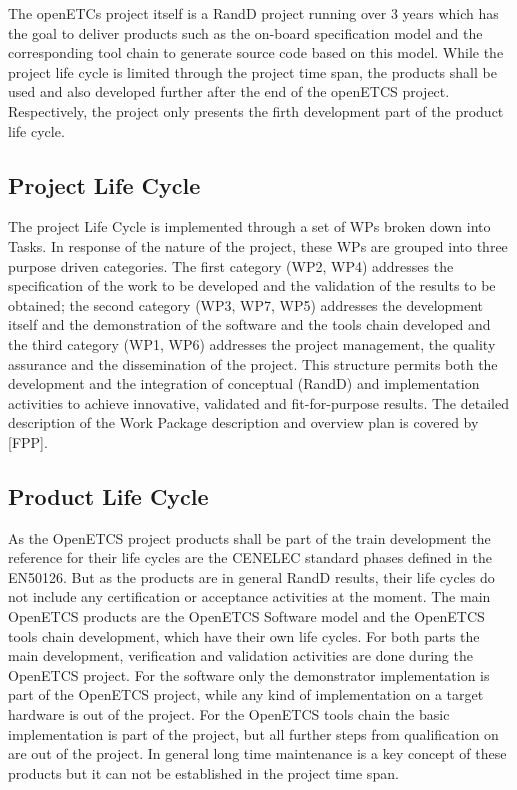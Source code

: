\documentclass{template/openetcs_article}
\begin{document}
The openETCs project itself is a \gls{RandD} project running over 3 years which has the goal to deliver products such as the on-board specification model and the corresponding tool chain to generate source code based on this model. While the project life cycle is limited through the project time span, the products shall be used and also developed further after the end of the openETCS project. Respectively, the project only presents the firth development part of the product life cycle.

\subsection{Project Life Cycle }

The project Life Cycle is implemented through a set of WPs broken down into Tasks. In response of the nature of the project, these WPs are grouped into three purpose driven categories. The first category (WP2, WP4) addresses the specification of the work to be developed and the validation of the results to be obtained; the second category (WP3, WP7, WP5) addresses the development itself and the demonstration of the software and the tools chain developed and the third category (WP1, WP6) addresses the project management, the quality assurance and the dissemination of the project.
This structure permits both the development and the integration of conceptual (\gls{RandD}) and implementation activities to achieve innovative, validated and fit-for-purpose results.
The detailed description of the Work Package description and overview plan is covered by [FPP].  


\subsection{Product Life Cycle }

As the OpenETCS project products shall be part of the train development the reference for their life cycles are the CENELEC standard phases defined in the EN50126. But as the products are in general \gls{RandD} results, their life cycles do not include any certification or acceptance activities at the moment.
The main OpenETCS products are the OpenETCS Software model and the OpenETCS tools chain development, which have their own life cycles. For both parts the main development, verification and validation activities are done during the OpenETCS project. For the software only the demonstrator implementation is part of the OpenETCS project, while any kind of implementation on a target hardware is out of the project. 
For the OpenETCS tools chain the basic implementation is part of the project, but all further steps from qualification on are out of the project.
In general long time maintenance is a key concept of these products but it can not be established in the project time span. 
\end{document}
